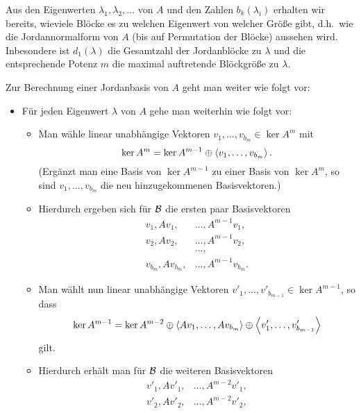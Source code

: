 Aus den Eigenwerten $\lambda_1, \lambda_2, \dotsc$ von $A$ und den Zahlen $b_k(\lambda_i)$ erhalten wir bereits, wieviele Blöcke es zu welchen Eigenwert von welcher Größe gibt, d.h.\ wie die Jordannormalform von $A$ (bis auf Permutation der Blöcke) aussehen wird.
Inbesondere ist $d_1(\lambda)$ die Gesamtzahl der Jordanblöcke zu $\lambda$ und die entsprechende Potenz $m$ die maximal auftretende Blöckgröße zu $\lambda$.

Zur Berechnung einer Jordanbasis von $A$ geht man weiter wie folgt vor:

\begin{itemize}[resume]
  \item
    Für jeden Eigenwert $\lambda$ von $A$ gehe man weiterhin wie folgt vor:
    \begin{itemize}
      \item
        Man wähle linear unabhängige Vektoren $v_1, \dotsc, v_{b_m} \in \ker A^m$ mit
        \[
                    \ker A^m
          =         \ker A^{m-1}
            \oplus  \left\langle v_1, \dotsc, v_{b_m} \right\rangle.
        \]
        (Ergänzt man eine Basis von $\ker A^{m-1}$ zu einer Basis von $\ker A^m$, so sind $v_1, \dotsc, v_{b_m}$ die neu hinzugekommenen Basisvektoren.)
      \item
        Hierdurch ergeben sich für $\mathcal{B}$ die ersten paar Basisvektoren
        \begin{align*}
          v_1,     A v_1,     &\dotsc, A^{m-1} v_1,     \\
          v_2,     A v_2,     &\dotsc, A^{m-1} v_2,     \\
                              &\dotsc,                  \\
          v_{b_m}, A v_{b_m}, &\dotsc, A^{m-1} v_{b_m}.
        \end{align*}
      \item
        Man wählt nun linear unabhängige Vektoren $v'_1, \dotsc, v'_{b_{m-1}} \in \ker A^{m-1}$, so dass
        \[
                    \ker A^{m-1}
          =         \ker A^{m-2}
            \oplus  \left\langle  A v_1, \dotsc, A v_{b_m}  \right\rangle
            \oplus  \left\langle  v'_1, \dotsc, v'_{b_{m-1}}  \right\rangle
        \]
        gilt.
      \item
        Hierdurch erhält man für $\mathcal{B}$ die weiteren Basisvektoren
        \begin{align*}
          v'_1,         A v'_1,         &\dotsc, A^{m-2} v'_1,          \\
          v'_2,         A v'_2,         &\dotsc, A^{m-2} v'_2,          \\

\end{align*}
\end{itemize}
\end{itemize}
